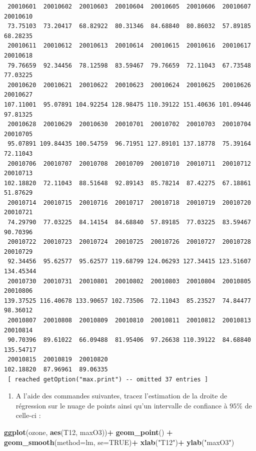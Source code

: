 \documentclass[
]{article}
\newenvironment{Shaded}{\begin{snugshade}}{\end{snugshade}}
\newcommand{\AttributeTok}[1]{\textcolor[rgb]{0.13,0.29,0.53}{#1}}
\newcommand{\ConstantTok}[1]{\textcolor[rgb]{0.56,0.35,0.01}{#1}}
\newcommand{\FunctionTok}[1]{\textcolor[rgb]{0.13,0.29,0.53}{\textbf{#1}}}
\newcommand{\NormalTok}[1]{#1}
\newcommand{\SpecialCharTok}[1]{\textcolor[rgb]{0.81,0.36,0.00}{\textbf{#1}}}
\newcommand{\StringTok}[1]{\textcolor[rgb]{0.31,0.60,0.02}{#1}}
\providecommand{\tightlist}{%
  \setlength{\itemsep}{0pt}\setlength{\parskip}{0pt}}
\begin{document}
\begin{Shaded}
\end{Shaded}

\begin{verbatim}
 20010601  20010602  20010603  20010604  20010605  20010606  20010607  20010610 
 73.75103  73.20417  68.82922  80.31346  84.68840  80.86032  57.89185  68.28235 
 20010611  20010612  20010613  20010614  20010615  20010616  20010617  20010618 
 79.76659  92.34456  78.12598  83.59467  79.76659  72.11043  67.73548  77.03225 
 20010620  20010621  20010622  20010623  20010624  20010625  20010626  20010627 
107.11001  95.07891 104.92254 128.98475 110.39122 151.40636 101.09446  97.81325 
 20010628  20010629  20010630  20010701  20010702  20010703  20010704  20010705 
 95.07891 109.84435 100.54759  96.71951 127.89101 137.18778  75.39164  72.11043 
 20010706  20010707  20010708  20010709  20010710  20010711  20010712  20010713 
102.18820  72.11043  88.51648  92.89143  85.78214  87.42275  67.18861  51.87629 
 20010714  20010715  20010716  20010717  20010718  20010719  20010720  20010721 
 74.29790  77.03225  84.14154  84.68840  57.89185  77.03225  83.59467  90.70396 
 20010722  20010723  20010724  20010725  20010726  20010727  20010728  20010729 
 92.34456  95.62577  95.62577 119.68799 124.06293 127.34415 123.51607 134.45344 
 20010730  20010731  20010801  20010802  20010803  20010804  20010805  20010806 
139.37525 116.40678 133.90657 102.73506  72.11043  85.23527  74.84477  98.36012 
 20010807  20010808  20010809  20010810  20010811  20010812  20010813  20010814 
 90.70396  89.61022  66.09488  81.95406  97.26638 110.39122  84.68840 135.54717 
 20010815  20010819  20010820 
102.18820  87.96961  89.06335 
 [ reached getOption("max.print") -- omitted 37 entries ]
\end{verbatim}

\begin{enumerate}
\def\labelenumi{\arabic{enumi}.}
\setcounter{enumi}{2}
\tightlist
\item
  A l'aide des commandes suivantes, tracez l'estimation de la droite de
  régression sur le nuage de points ainsi qu'un intervalle de confiance
  à \(95\%\) de celle-ci :
\end{enumerate}

\begin{Shaded}
\begin{Highlighting}[]
\FunctionTok{ggplot}\NormalTok{(ozone, }\FunctionTok{aes}\NormalTok{(T12, maxO3))}\SpecialCharTok{+}
    \FunctionTok{geom\_point}\NormalTok{() }\SpecialCharTok{+}
    \FunctionTok{geom\_smooth}\NormalTok{(}\AttributeTok{method=}\NormalTok{lm, }\AttributeTok{se=}\ConstantTok{TRUE}\NormalTok{)}\SpecialCharTok{+}
    \FunctionTok{xlab}\NormalTok{(}\StringTok{"T12"}\NormalTok{)}\SpecialCharTok{+}  \FunctionTok{ylab}\NormalTok{(}\StringTok{"maxO3"}\NormalTok{)}
\end{Highlighting}
\end{Shaded}
\end{document}
